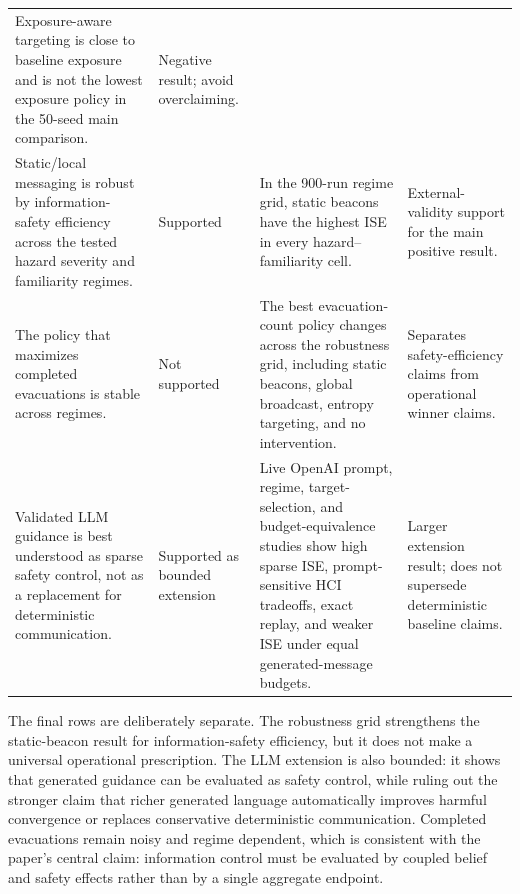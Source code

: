 \begin{table}[!t]
\begin{tabular}{p{}p{}p{}p{}}
Exposure-aware targeting is close to baseline exposure and is not the lowest
exposure policy in the 50-seed main comparison. & Negative result; avoid
overclaiming. \\
\addlinespace
Static/local messaging is robust by information-safety efficiency across the
tested hazard severity and familiarity regimes. & Supported & In the 900-run
regime grid, static beacons have the highest ISE in every
hazard--familiarity cell. & External-validity support for the main positive
result. \\
\addlinespace
The policy that maximizes completed evacuations is stable across regimes. &
Not supported & The best evacuation-count policy changes across the
robustness grid, including static beacons, global broadcast, entropy targeting,
and no intervention. & Separates safety-efficiency claims from operational
winner claims. \\
\addlinespace
Validated LLM guidance is best understood as sparse safety control, not as a
replacement for deterministic communication. & Supported as bounded extension &
Live OpenAI prompt, regime, target-selection, and budget-equivalence studies
show high sparse ISE, prompt-sensitive HCI tradeoffs, exact replay, and weaker
ISE under equal generated-message budgets. & Larger extension result; does not
supersede deterministic baseline claims. \\
\bottomrule
\end{tabular}
\end{table}

The final rows are deliberately separate. The robustness grid strengthens the
static-beacon result for information-safety efficiency, but it does not make a
universal operational prescription. The LLM extension is also bounded: it
shows that generated guidance can be evaluated as safety control, while ruling
out the stronger claim that richer generated language automatically improves
harmful convergence or replaces conservative deterministic communication.
Completed evacuations remain noisy and regime dependent, which is consistent
with the paper's central claim: information control must be evaluated by
coupled belief and safety effects rather than by a single aggregate endpoint.
